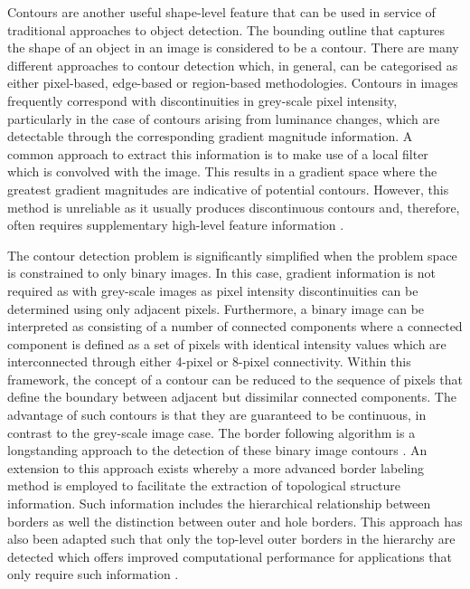 Contours are another useful shape-level feature that can be used in service of traditional approaches to object detection. The bounding outline that captures the shape of an object in an image is considered to be a contour. There are many different approaches to contour detection which, in general, can be categorised as either pixel-based, edge-based or region-based methodologies. Contours in images frequently correspond with discontinuities in grey-scale pixel intensity, particularly in the case of contours arising from luminance changes, which are detectable through the corresponding gradient magnitude information. A common approach to  extract this information is to make use of a local filter which is convolved with the image. This results in a gradient space where the greatest gradient magnitudes are indicative of potential contours. However, this method is unreliable as it usually produces discontinuous contours and, therefore, often requires supplementary high-level feature information \cite{Gong2018:Overview_of_Contour_Detection_Approaches}.

The contour detection problem is significantly simplified when the problem space is constrained to only binary images. In this case, gradient information is not required as with grey-scale images as pixel intensity discontinuities can be determined using only adjacent pixels. Furthermore, a binary image can be interpreted as consisting of a number of connected components where a connected component is defined as a set of pixels with identical intensity values which are interconnected through either 4-pixel or 8-pixel connectivity. Within this framework, the concept of a contour can be reduced to the sequence of pixels that define the boundary between adjacent but dissimilar connected components. The advantage of such contours is that they are guaranteed to be continuous, in contrast to the grey-scale image case. The border following algorithm is a longstanding approach to the detection of these binary image contours \cite{Suzuki:Binary_Image_Topological_Structural_Analysis}. An extension to this approach exists whereby a more advanced border labeling method is employed to facilitate the extraction of topological structure information. Such information includes the hierarchical relationship between borders as well the distinction between outer and hole borders. This approach has also been adapted such that only the top-level outer borders in the hierarchy are detected which offers improved computational performance for applications that only require such information \cite{Yokoi:Binary_Image_Topological_Properties_Analysis}.


